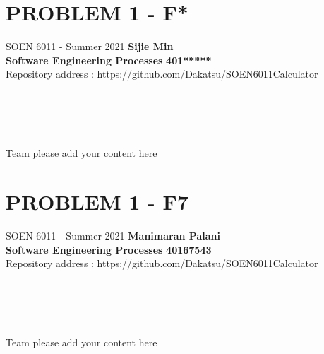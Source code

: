 \documentclass[a4paper, 11pt]{report}
\begin{document}
\section*{PROBLEM 1 - F*}
\normalsize {SOEN 6011 - Summer 2021} \hfill \textbf{Sijie Min} \\
\textbf{ Software Engineering Processes}  \hfill \textbf{401*****} \\
\hfill Repository address : https://github.com/Dakatsu/SOEN6011Calculator
\\\\\\\\\\
 \begin{center} Team please add your content here \end{center}
\pagebreak

\section*{PROBLEM 1 - F7}
\normalsize {SOEN 6011 - Summer 2021} \hfill \textbf{Manimaran Palani} \\
\textbf{ Software Engineering Processes}  \hfill \textbf{40167543} \\
\hfill Repository address : https://github.com/Dakatsu/SOEN6011Calculator
\\\\\\\\\\
 \begin{center} Team please add your content here \end{center}
\end{document}
